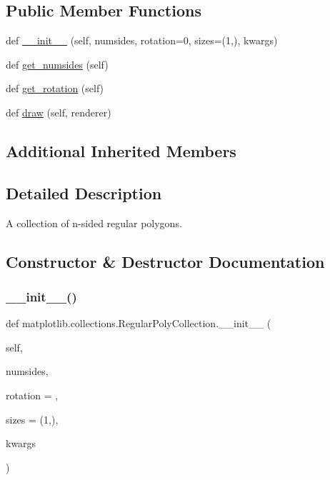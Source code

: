\subsection*{Public Member Functions}
\begin{DoxyCompactItemize}
\item 
def \hyperlink{classmatplotlib_1_1collections_1_1RegularPolyCollection_afda450c5bf471e56f666fcd45d5632d5}{\+\_\+\+\_\+init\+\_\+\+\_\+} (self, numsides, rotation=0, sizes=(1,), kwargs)
\item 
def \hyperlink{classmatplotlib_1_1collections_1_1RegularPolyCollection_af4c0bf0bf8e8ff9c99bea071cc81efea}{get\+\_\+numsides} (self)
\item 
def \hyperlink{classmatplotlib_1_1collections_1_1RegularPolyCollection_ae7d6c7b3db17710c52c9f6733cd3b649}{get\+\_\+rotation} (self)
\item 
def \hyperlink{classmatplotlib_1_1collections_1_1RegularPolyCollection_abb5880647d32c4e7b2cb869d12702038}{draw} (self, renderer)
\end{DoxyCompactItemize}
\subsection*{Additional Inherited Members}


\subsection{Detailed Description}
\begin{DoxyVerb}A collection of n-sided regular polygons.\end{DoxyVerb}
 

\subsection{Constructor \& Destructor Documentation}
\mbox{\label{classmatplotlib_1_1collections_1_1RegularPolyCollection_afda450c5bf471e56f666fcd45d5632d5}} 
\subsubsection{\texorpdfstring{\+\_\+\+\_\+init\+\_\+\+\_\+()}{\_\_init\_\_()}}
{\footnotesize\ttfamily def matplotlib.\+collections.\+Regular\+Poly\+Collection.\+\_\+\+\_\+init\+\_\+\+\_\+ (\begin{DoxyParamCaption}\item[{}]{self,  }\item[{}]{numsides,  }\item[{}]{rotation = {},  }\item[{}]{sizes = {\ttfamily (1,)},  }\item[{}]{kwargs }\end{DoxyParamCaption})}

